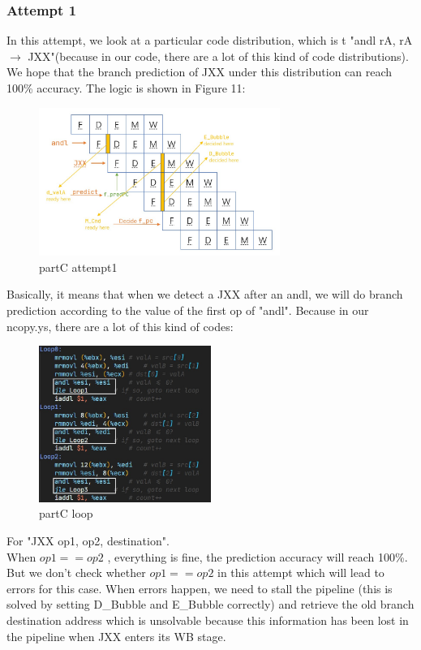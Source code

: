 \documentclass{article}
\begin{document}
\subsubsection{Attempt 1}
In this attempt, we look at a particular code distribution, 
which is t "andl rA, rA $\rightarrow$ JXX"(because in our code, there are a lot of this kind of code distributions). 
We hope that the branch prediction of JXX under this distribution can reach 100\% accuracy.
The logic is shown in Figure 11:
\begin{figure}[H] %
        \centering %
        \includegraphics[width=0.7\textwidth]{partC-attempt1.jpg} %
        \caption{partC attempt1} %
        \label{Fig.partC-correctness} %
\end{figure}
Basically, it means that when we detect a JXX after an andl, we will do branch prediction according to the value of the first op of "andl". Because in our ncopy.ys, there are a lot of this
kind of codes:
\begin{figure}[H] %
        \centering %
        \includegraphics[width=0.5\textwidth]{partC-loop-demo.jpg} %
        \caption{partC loop} %
        \label{Fig.partC-correctness} %
\end{figure}
For "JXX op1, op2, destination".\\
When $op1 == op2$ , everything is fine, the prediction accuracy will reach 100\%. But we don't check whether $op1 == op2$ in this attempt which will lead to errors for this case.
When errors happen, we need to stall the pipeline (this is solved by setting D\_Bubble and E\_Bubble correctly) and retrieve the old branch destination address which is unsolvable because this information has been  
lost in the pipeline when JXX enters its WB stage.
\end{document}
